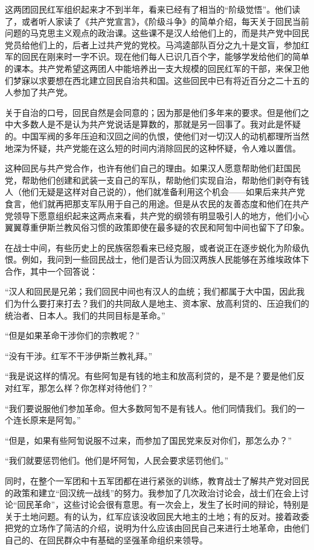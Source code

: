 \documentclass[10pt]{book}
\begin{document}
这两团回民红军组织起来才不到半年，看来已经有了相当的“阶级觉悟”。他们读了，或者听人家读了《共产党宣言》，《阶级斗争》的简单介绍，每天关于回民当前问题的马克思主义观点的政治课。这些课不是汉人给他们上的，而是共产党中回民党员给他们上的，后者上过共产党的党校。马鸿逵部队百分之九十是文盲，参加红军的回民在刚来时一字不识。现在他们每人已识几百个字，能够学发给他们的简单的课本。共产党希望这两团人中能培养出一支大规模的回民红军的干部，来保卫他们梦寐以求要想在西北建立回民自治共和国。这些回民中已有将近百分之二十五的人参加了共产党。

关于自治的口号，回民自然是会同意的；因为那是他们多年来的要求。但是他们之中大多数人是不是认为共产党说话是算数的，那就是另一回事了。我对此是怀疑的。中国军阀的多年压迫和汉回之间的仇恨，使他们对一切汉人的动机都理所当然地深为怀疑，共产党能在这么短的时间内消除回民的这种怀疑，令人难以置信。

这种回民与共产党合作，也许有他们自己的理由。如果汉人愿意帮助他们赶国民党，帮助他们创建和武装一支自己的军队，帮助他们实现自治，帮助他们剥夺有钱人（他们无疑是这样对自己说的），他们就准备利用这个机会——如果后来共产党食言，他们就再把那支军队用于自己的用途。但是从农民的友善态度和他们在共产党领导下愿意组织起来这两点来看，共产党的纲领有明显吸引人的地方，他们小心翼翼尊重伊斯兰教风俗习惯的政策即使在最多疑的农民和阿訇中间也留下了印象。

在战士中间，有些历史上的民族宿怨看来已经克服，或者说正在逐步蜕化为阶级仇恨。例如，我问到一些回民战士，他们是否认为回汉两族人民能够在苏维埃政体下合作，其中一个回答说：

“汉人和回民是兄弟；我们回民中间也有汉人的血统；我们都属于大中国，因此我们为什么要打来打去？我们的共同敌人是地主、资本家、放高利贷的、压迫我们的统治者、日本人。我们的共同目标是革命。”

“但是如果革命干涉你们的宗教呢？”

“没有干涉。红军不干涉伊斯兰教礼拜。”

“我是说这样的情况。有些阿訇是有钱的地主和放高利贷的，是不是？要是他们反对红军，那怎么样？你怎样对待他们？”

“我们要说服他们参加革命。但大多数阿訇不是有钱人。他们同情我们。我们的一个连长原来是阿訇。”

“但是，如果有些阿訇说服不过来，而参加了国民党来反对你们，那怎么办？”

“我们就要惩罚他们。他们是坏阿訇，人民会要求惩罚他们。”

同时，在整个一军团和十五军团都在进行紧张的训练，教育战士了解共产党对回民的政策和建立“回汉统一战线”的努力。我参加了几次政治讨论会，战士们在会上讨论“回民革命”，这些讨论会很有意思。有一次会上，发生了长时间的辩论，特别是关于土地问题。有的认为，红军应该没收回民大地主的土地；有的反对。接着政委把党的立场作了简洁的介绍，说明为什么应该由回民自己来进行土地革命，由他们自己的、在回民群众中有基础的坚强革命组织来领导。
\end{document}
